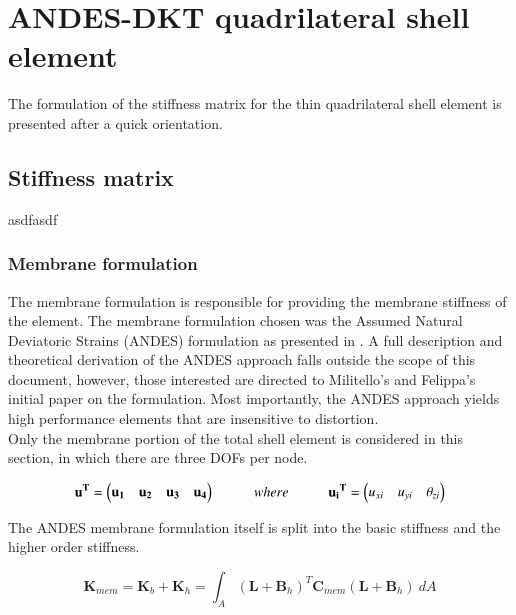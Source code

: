 \chapter{ANDES-DKT quadrilateral shell element}

The formulation of the stiffness matrix for the thin quadrilateral shell element is presented after a quick orientation.

\section{Stiffness matrix}

asdfasdf



\subsection{Membrane formulation}

The membrane formulation is responsible for providing the membrane stiffness of the element. The membrane formulation chosen was the Assumed Natural Deviatoric Strains (ANDES) formulation as presented in \cite{Hau94}. A full description and theoretical derivation of the ANDES approach falls outside the scope of this document, however, those interested are directed to Militello's and Felippa's initial paper \cite{Fel91} on the formulation. Most importantly, the ANDES approach yields high performance elements that are insensitive to distortion.\\

Only the membrane portion of the total shell element is considered in this section, in which there are three DOFs per node.

\begin{equation} 
\mathbf{u^T} = 
\begin{pmatrix}
\mathbf{u_1} & \mathbf{u_2} & \mathbf{u_3} & \mathbf{u_4}
\end{pmatrix} 
\hspace{10mm}
where
\hspace{10mm}
\mathbf{u{_i}^T} = 
\begin{pmatrix}
{u_{xi}} & {u_{yi}} & {\theta_{zi}}
\end{pmatrix}
\label{equation04}
\end{equation}

The ANDES membrane formulation itself is split into the basic stiffness and the higher order stiffness.

\begin{equation} 
\mathbf{K}_{mem} = \mathbf{K}_{b} + \mathbf{K}_{h} = \int_A (\mathbf{L} + \mathbf{B}_h)^T \mathbf{C}_{mem} (\mathbf{L} + \mathbf{B}_h)\ dA
\label{equationMEM}
\end{equation}

